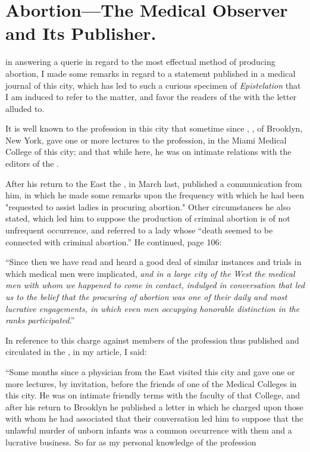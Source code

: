 \section{Abortion---The  Medical  Observer and
Its Publisher.}


 in answering a querie in regard to the
most effectual method of producing abortion, I made some remarks in
regard to a statement published in a medical journal of this city, which
has led to such a curious specimen of \emph{Epistelation} that I am induced
to refer to the matter, and favor the readers of the  with the
letter alluded to.

It is well known to the profession in this city that sometime since
, \md, of Brooklyn, New York, gave one or more lectures
to the profession, in the Miami Medical College of this city; and that
while here, he was on intimate relations with the editors of the .

After his return to the East the , in March last, published a
communication from him, in which he made some remarks upon the
frequency with which he had been "requested to assist ladies in procuring
abortion." Other circumstances he also stated, which led him to
suppose the production of criminal abortion is of not unfrequent occurrence,
and referred to a lady whose ``death seemed to be connected with
criminal abortion.''   He continued, page 106:

``Since then we have read and heard a good deal of similar instances
and trials in which medical men were implicated, \emph{and in a large city
of the West the medical men with whom we happened to come in
contact, indulged in conversation that led us to the belief that the
procuring of abortion was one of their daily and most lucrative
engagements, in which even men occupying honorable distinction in
the ranks participated}.''

In reference to this charge against members of the profession thus
published and circulated in the , in my article, I
said:

``Some months since a physician from the East visited this city and
gave one or more lectures, by invitation, before the friends of one of
the Medical Colleges in this city. He was on intimate friendly terms
with the faculty of that College, and after his return to Brooklyn he
published a letter in which he charged upon those with whom he had
associated that their conversation led him to suppose that the unlawful
murder of unborn infants was a common occurrence with them and a
lucrative business.   So far as my personal knowledge of the profession\endinput
